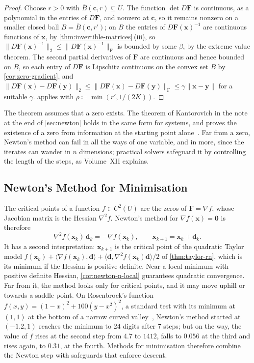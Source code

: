 \begin{proof}
Choose $r>0$ with $\bar B(\mathbf c,r)\subseteq U$. The function $\det D\mathbf F$ is continuous, as a polynomial in the entries of $D\mathbf F$, and nonzero at $\mathbf c$, so it remains nonzero on a smaller closed ball $B=\bar B(\mathbf c,r')$; on $B$ the entries of $D\mathbf F(\mathbf x)^{-1}$ are continuous functions of $\mathbf x$, by \cref{thm:invertible-matrices}\,(iii), so $\|D\mathbf F(\mathbf x)^{-1}\|_2\le\|D\mathbf F(\mathbf x)^{-1}\|_{\mathrm F}$ is bounded by some $\beta$, by the extreme value theorem. The second partial derivatives of $\mathbf F$ are continuous and hence bounded on $B$, so each entry of $D\mathbf F$ is Lipschitz continuous on the convex set $B$ by \cref{cor:zero-gradient}, and $\|D\mathbf F(\mathbf x)-D\mathbf F(\mathbf y)\|_2\le\|D\mathbf F(\mathbf x)-D\mathbf F(\mathbf y)\|_{\mathrm F}\le\gamma\|\mathbf x-\mathbf y\|$ for a suitable $\gamma$.  applies with $\rho\coloneqq\min(r',1/(2K))$.
\end{proof}

The theorem assumes that a zero exists. The theorem of Kantorovich in the note at the end of \cref{sec:newton} holds in the same form for systems, and proves the existence of a zero from information at the starting point alone~\cite{ortega2000}. Far from a zero, Newton's method can fail in all the ways of one variable, and in more, since the iterates can wander in $n$ dimensions; practical solvers safeguard it by controlling the length of the steps, as Volume~XII explains.

\subsection{Newton's Method for Minimisation}

The critical points of a function $f\in C^2(U)$ are the zeros of $\mathbf F=\nabla f$, whose Jacobian matrix is the Hessian $\nabla^2f$. Newton's method for $\nabla f(\mathbf x)=\mathbf0$ is therefore
\[
\nabla^2f(\mathbf x_k)\,\mathbf d_k=-\nabla f(\mathbf x_k),\qquad\mathbf x_{k+1}=\mathbf x_k+\mathbf d_k .
\]
It has a second interpretation: $\mathbf x_{k+1}$ is the critical point of the quadratic Taylor model $f(\mathbf x_k)+\langle\nabla f(\mathbf x_k),\mathbf d\rangle+\langle\mathbf d,\nabla^2f(\mathbf x_k)\mathbf d\rangle/2$ of \cref{thm:taylor-rn}, which is its minimum if the Hessian is positive definite. Near a local minimum with positive definite Hessian, \cref{cor:newton-n-local} guarantees quadratic convergence. Far from it, the method looks only for critical points, and it may move uphill or towards a saddle point. On Rosenbrock's function $f(x,y)=(1-x)^2+100(y-x^2)^2$, a standard test with its minimum at $(1,1)$ at the bottom of a narrow curved valley~\cite{rosenbrock1960}, Newton's method started at $(-1.2,1)$ reaches the minimum to $24$ digits after $7$ steps; but on the way, the value of $f$ rises at the second step from $4.7$ to $1412$, falls to $0.056$ at the third and rises again, to $0.31$, at the fourth. Methods for minimisation therefore combine the Newton step with safeguards that enforce descent.


